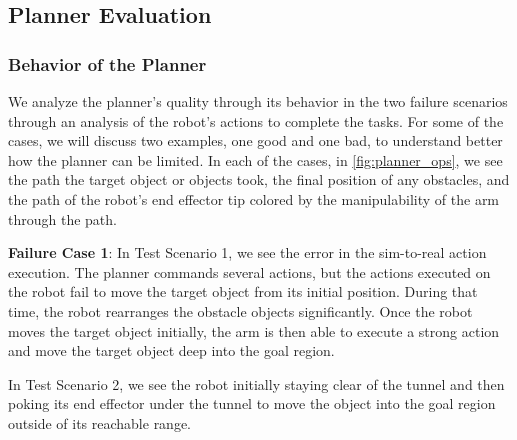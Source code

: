 \subsection{Planner Evaluation}\label{sec:planner_eval}



\subsubsection{Behavior of the Planner} 
We analyze the planner's quality through its behavior in the two failure scenarios through an analysis of the robot's actions to complete the tasks. For some of the cases, we will discuss two examples, one good and one bad, to understand better how the planner can be limited. In each of the cases, in \cref{fig:planner_ops}, we see the path the target object or objects took, the final position of any obstacles, and the path of the robot's end effector tip colored by the manipulability of the arm through the path.

\textbf{Failure Case 1}: In Test Scenario 1, we see the error in the sim-to-real action execution. The planner commands several actions, but the actions executed on the robot fail to move the target object from its initial position. During that time, the robot rearranges the obstacle objects significantly. Once the robot moves the target object initially, the arm is then able to execute a strong action and move the target object deep into the goal region.

In Test Scenario 2, we see the robot initially staying clear of the tunnel and then poking its end effector under the tunnel to move the object into the goal region outside of its reachable range.

